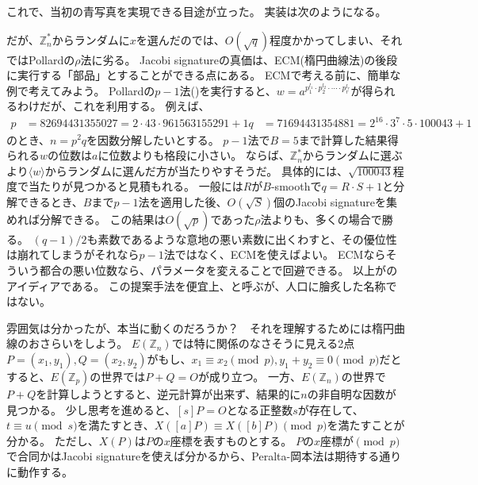 これで、当初の青写真を実現できる目途が立った。
実装は次のようになる。


だが、$\mathbb{Z}_n^*$からランダムに$x$を選んだのでは、$O(\sqrt{q})$程度かかってしまい、それではPollardの$\rho$法に劣る。
Jacobi signatureの真価は、ECM(楕円曲線法)の後段に実行する「部品」とすることができる点にある。
ECMで考える前に、簡単な例で考えてみよう。
Pollardの$p-1$法()を実行すると、$w=a^{p_1^{l_1}\cdot p_2^{l_2}\cdot\cdots\cdot p_r^{l_r}}$が得られるわけだが、これを利用する。
例えば、
\begin{align*}
p&=82694431355027=2\cdot43\cdot961563155291+1
q&=71694431354881=2^{16}\cdot3^7\cdot5\cdot100043+1
\end{align*}
のとき、$n=p^2q$を因数分解したいとする。
$p-1$法で$B=5$まで計算した結果得られる$w$の位数は$a$に位数よりも格段に小さい。
ならば、$\mathbb{Z}_n^*$からランダムに選ぶより$\langle w\rangle$からランダムに選んだ方が当たりやすそうだ。
具体的には、$\sqrt{100043}$程度で当たりが見つかると見積もれる。
一般には$R$が$B$-smoothで$q=R\cdot S+1$と分解できるとき、$B$まで$p-1$法を適用した後、$O(\sqrt{S})$個のJacobi signatureを集めれば分解できる。
この結果は$O(\sqrt{p})$であった$\rho$法よりも、多くの場合で勝る。
$(q-1)/2$も素数であるような意地の悪い素数に出くわすと、その優位性は崩れてしまうがそれなら$p-1$法ではなく、ECMを使えばよい。
ECMならそういう都合の悪い位数なら、パラメータを変えることで回避できる。
以上が\cite{PeraltaOkamoto1996}のアイディアである。
この提案手法を便宜上、と呼ぶが、人口に膾炙した名称ではない。


雰囲気は分かったが、本当に動くのだろうか？　それを理解するためには楕円曲線のおさらいをしよう。
$E(\mathbb{Z}_n)$では特に関係のなさそうに見える2点$P=(x_1,y_1),Q=(x_2,y_2)$がもし、$x_1\equiv x_2\pmod{p}, y_1+y_2\equiv0\pmod{p}$だとすると、$E(\mathbb{Z}_p)$の世界では$P+Q=O$が成り立つ。
一方、$E(\mathbb{Z}_n)$の世界で$P+Q$を計算しようとすると、逆元計算が出来ず、結果的に$n$の非自明な因数が見つかる。
少し思考を進めると、$[s]P=O$となる正整数$s$が存在して、$t\equiv u\pmod{s}$を満たすとき、$X([a]P)\equiv X([b]P)\pmod{p}$を満たすことが分かる。
ただし、$X(P)$は$P$の$x$座標を表すものとする。
$P$の$x$座標が$\pmod{p}$で合同かはJacobi signatureを使えば分かるから、Peralta-岡本法は期待する通りに動作する。

